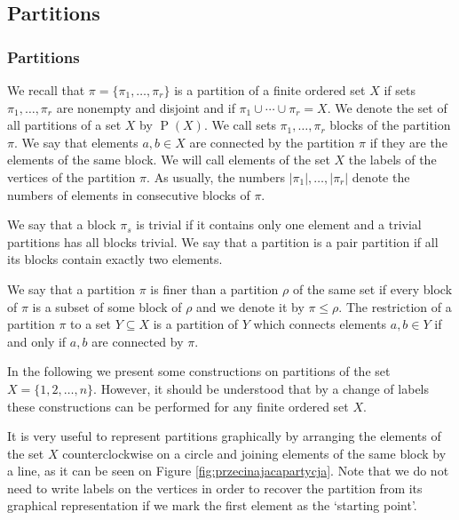 \documentclass[12pt,dvips]{amsart}
\numberwithin{equation}{section} \numberwithin{figure}{section}
\theoremstyle{plain}
\theoremstyle{definition}
\theoremstyle{remark}
\DeclareMathOperator{\PP}{P}
\DeclareMathOperator{\PPP}{P_2}
\begin{document}
%
%
%
%
%
%
%
%
%
%
%










\subsection{Partitions} \label{sec:combinatorial}



\subsubsection{Partitions} \label{subsec:partitions}
 We recall that $\pi=\{\pi_1,\dots,\pi_r\}$ is a
partition of a finite ordered set $X$ if sets $\pi_1,\dots,\pi_r$
are nonempty and disjoint and if $\pi_1\cup\cdots\cup\pi_r=X$. We
denote the set of all partitions of a set $X$ by $\PP(X)$. We call
sets $\pi_1,\dots,\pi_r$ blocks of the partition $\pi$. We say that
elements $a,b\in X$ are connected by the partition $\pi$ if they are
the elements of the same block.
We will call elements of the set $X$ the labels of the vertices of
the partition $\pi$. As usually, the numbers $|\pi_1|,\dots,|\pi_r|$
denote the numbers of elements in consecutive blocks of $\pi$.

We say that a block $\pi_s$ is trivial if it contains only one
element and a trivial partitions has all blocks
trivial. We say
that a partition is a pair partition if all its blocks contain exactly
two elements.

We say that a partition $\pi$ is finer than a partition $\rho$ of
the same set if every block of $\pi$ is a subset of some block of
$\rho$ and we denote it by  $\pi\leq\rho$.
The restriction of a partition $\pi$ to a set $Y\subseteq X$ is a partition of $Y$ which connects
elements $a,b\in Y$ if and only if $a,b$ are connected by $\pi$.

In the following we present some constructions on partitions of the
set $X=\{1,2,\dots,n\}$. However, it should be understood that by a
change of labels these constructions can be performed for any finite
ordered set $X$.

It is very useful to represent partitions graphically by arranging
the elements of the set $X$ counterclockwise on a circle and joining
elements of the same block by a line, as it can be seen on Figure
\ref{fig:przecinajacapartycja}. Note that we do not need to write
labels on the vertices in order to recover the partition from its
graphical representation if we mark the first element as the
`starting point'.
\end{document}
